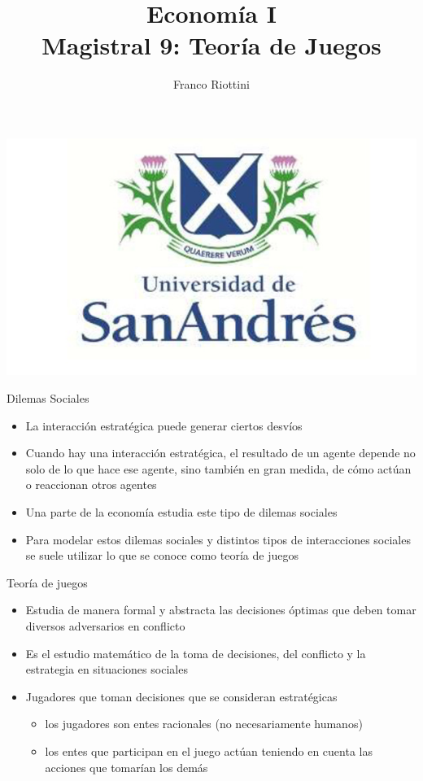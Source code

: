 \documentclass{beamer}
\title[Economía I]{Economía I \vspace{4mm}
\\ Magistral 9: Teoría de Juegos}
\date{}
\author[Riottini]{Franco Riottini}
\institute[]{Universidad de San Andrés}
\begin{document}
\begin{frame}
\titlepage
\centering
\includegraphics[scale=0.2]{../Figures/logoUDESA.jpg} 
\end{frame}


\begin{frame}{Dilemas Sociales}
    \begin{itemize}
        \item La interacción estratégica puede generar ciertos desvíos
        \item Cuando hay una interacción estratégica, el resultado de un agente depende no solo de lo que hace ese agente, sino también en gran medida, de cómo actúan o reaccionan otros agentes
        \item Una parte de la economía estudia este tipo de dilemas sociales
        \item Para modelar estos dilemas sociales y distintos tipos de interacciones sociales se suele utilizar lo que se conoce como teoría de juegos
    \end{itemize}
\end{frame}

\begin{frame}{Teoría de juegos}
    \begin{itemize}
        \item Estudia de manera formal y abstracta las decisiones óptimas que deben tomar diversos adversarios en conflicto
        \item Es el estudio matemático de la toma de decisiones, del conflicto y la estrategia en situaciones sociales
        \item Jugadores que toman decisiones que se consideran estratégicas
        \begin{itemize}
            \item los jugadores son entes racionales (no necesariamente humanos)
            \item los entes que participan en el juego actúan teniendo en cuenta las acciones que tomarían los demás
        \end{itemize}
    \end{itemize}
\end{frame}
\end{document}
